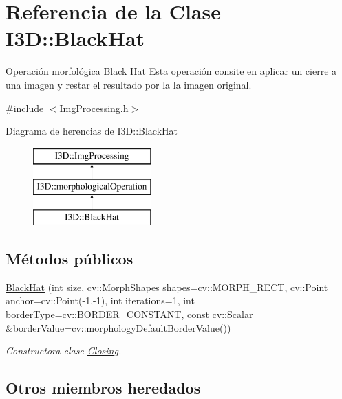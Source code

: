 \hypertarget{class_i3_d_1_1_black_hat}{}\section{Referencia de la Clase I3D\+:\+:Black\+Hat}
\label{class_i3_d_1_1_black_hat}


Operación morfológica Black Hat Esta operación consite en aplicar un cierre a una imagen y restar el resultado por la la imagen original.  




{\ttfamily \#include $<$Img\+Processing.\+h$>$}

Diagrama de herencias de I3D\+:\+:Black\+Hat\begin{figure}[H]
\begin{center}
\leavevmode
\includegraphics[height=3.000000cm]{class_i3_d_1_1_black_hat}
\end{center}
\end{figure}
\subsection*{Métodos públicos}
\begin{DoxyCompactItemize}
\item 
\hyperlink{class_i3_d_1_1_black_hat_ac3428524b0f9ed91a353874e5570e905}{Black\+Hat} (int size, cv\+::\+Morph\+Shapes shapes=cv\+::\+M\+O\+R\+P\+H\+\_\+\+R\+E\+CT, cv\+::\+Point anchor=cv\+::\+Point(-\/1,-\/1), int iterations=1, int border\+Type=cv\+::\+B\+O\+R\+D\+E\+R\+\_\+\+C\+O\+N\+S\+T\+A\+NT, const cv\+::\+Scalar \&border\+Value=cv\+::morphology\+Default\+Border\+Value())
\begin{DoxyCompactList}\small\item\em Constructora clase \hyperlink{class_i3_d_1_1_closing}{Closing}. \end{DoxyCompactList}\end{DoxyCompactItemize}
\subsection*{Otros miembros heredados}


